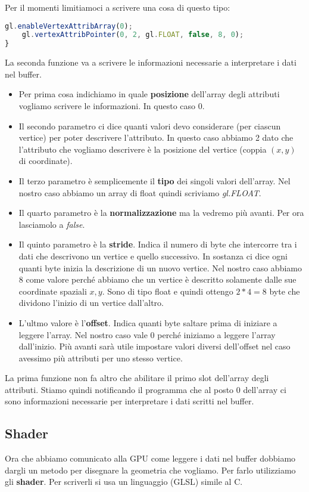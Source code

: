 Per il momenti limitiamoci a scrivere una cosa di questo tipo:
\begin{lstlisting}[language=javascript, firstnumber=10]
	gl.enableVertexAttribArray(0);
	gl.vertexAttribPointer(0, 2, gl.FLOAT, false, 8, 0);
}
\end{lstlisting}
La seconda funzione va a scrivere le informazioni necessarie a interpretare i dati nel
buffer.
\begin{itemize}
	\item Per prima cosa indichiamo in quale \textbf{posizione} dell'array degli attributi
	      vogliamo scrivere le informazioni. In questo caso 0.
	\item Il secondo parametro ci dice quanti valori devo considerare (per ciascun vertice)
	      per poter descrivere l'attributo. In questo caso abbiamo 2 dato che l'attributo
	      che vogliamo descrivere \`e la posizione del vertice (coppia $(x, y)$ di
	      coordinate).
	\item Il terzo parametro \`e semplicemente il \textbf{tipo} dei singoli valori dell'array.
	      Nel nostro caso abbiamo un array di float quindi scriviamo \emph{gl.FLOAT}.
	\item Il quarto parametro \`e la \textbf{normalizzazione} ma la vedremo pi\`u avanti.
	      Per ora lasciamolo a \emph{false}.
	\item Il quinto parametro \`e la \textbf{stride}. Indica il numero di byte che intercorre
	      tra i dati che descrivono un vertice e quello successivo. In sostanza ci dice ogni
	      quanti byte inizia la descrizione di un nuovo vertice. Nel nostro caso abbiamo 8
	      come valore perch\'e abbiamo che un vertice \`e descritto solamente dalle sue
	      coordinate spaziali $x, y$. Sono di tipo float e quindi ottengo $2 * 4 = 8$ byte
	      che dividono l'inizio di un vertice dall'altro.
	\item L'ultmo valore \`e l'\textbf{offset}. Indica quanti byte saltare prima di iniziare
	      a leggere l'array. Nel nostro caso vale 0 perch\'e iniziamo a leggere l'array
	      dall'inizio. Pi\`u avanti sar\`a utile impostare valori diversi dell'offset
	      nel caso avessimo pi\`u attributi per uno stesso vertice.
\end{itemize}
La prima funzione non fa altro che abilitare il primo slot dell'array degli attributi.
Stiamo quindi notificando il programma che al posto 0 dell'array ci sono informazioni
necessarie per interpretare i dati scritti nel buffer.

\subsection{Shader}
Ora che abbiamo comunicato alla GPU come leggere i dati nel buffer dobbiamo dargli un
metodo per disegnare la geometria che vogliamo. Per farlo utilizziamo gli \textbf{shader}.
Per scriverli si usa un linguaggio (GLSL) simile al C.

